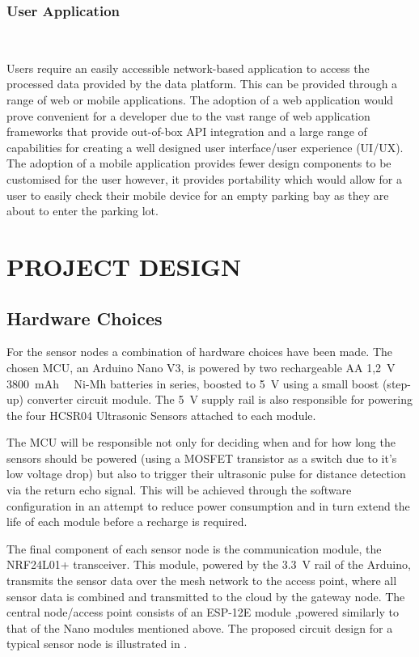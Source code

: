 \documentclass[10pt,twocolumn]{witseiepaper}
\begin{document}
		\subsubsection{User Application} $   $
		
			Users require an easily accessible network-based application to access the processed data provided by the data platform. This can be provided through a range of web or mobile applications. The adoption of a web application would prove convenient for a developer due to the vast range of web application frameworks that provide out-of-box API integration and a large range of capabilities for creating a well designed user interface/user experience (UI/UX). The adoption of a mobile application provides fewer design components to be customised for the user however, it provides portability which would allow for a user to easily check their mobile device for an empty parking bay as they are about to enter the parking lot.
			

\section{PROJECT DESIGN}
	\subsection{Hardware Choices} \label{hardware_choices}
	
		For the sensor nodes a combination of hardware choices have been made. The chosen MCU, an Arduino Nano V3, is powered by two rechargeable AA 1,2~V 3800~mAh ~\ \mbox{Ni-Mh} batteries in series, boosted to 5~V using a small boost (step-up) converter circuit module. The 5~V supply rail is also responsible for powering the four HCSR04 Ultrasonic Sensors attached to each module. 
		
		The MCU will be responsible not only for deciding when and for how long the sensors should be powered (using a MOSFET transistor as a switch due to it's low voltage drop) but also to trigger their ultrasonic pulse for distance detection via the return echo signal. This will be achieved through the software configuration in an attempt to reduce power consumption and in turn extend the life of each module before a recharge is required.
		
		The final component of each sensor node is the communication module, the NRF24L01+ transceiver. This module, powered by the 3.3~V rail of the Arduino, transmits the sensor data over the mesh network to the access point, where all sensor data is combined and transmitted to the cloud by the gateway node. The central node/access point consists of an ESP-12E module ,powered similarly to that of the Nano modules mentioned above. The proposed circuit design for a typical sensor node is illustrated in .
\end{document}
